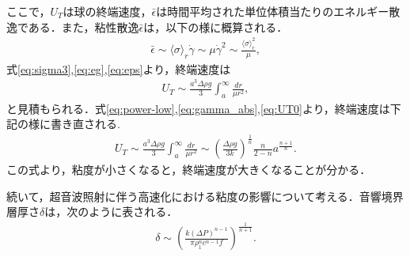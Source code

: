 ここで，$U_T$は球の終端速度，$\bar{\epsilon}$は時間平均された単位体積当たりのエネルギー散逸である．また，粘性散逸$\bar{\epsilon}$は，以下の様に概算される．
\begin{eqnarray}
    \bar{\epsilon} \sim \langle\sigma\rangle_r\dot{\gamma} \sim \mu \dot{\gamma}^2 \sim \frac{\langle\sigma\rangle_r^2}{\mu} ,
    \label{eq:eps}
\end{eqnarray}
式\ref{eq:sigma3},\ref{eq:eg},\ref{eq:eps}より，終端速度は
\begin{eqnarray}
    U_T \sim \frac{a^3\Delta\rho g}{3}\int_a^\infty\frac{dr}{\mu r^2} ,
    \label{eq:UT0}
\end{eqnarray}
と見積もられる．式\ref{eq:power-low},\ref{eq:gamma_abs},\ref{eq:UT0}より，終端速度は下記の様に書き直される.
\begin{eqnarray}
    U_T \sim \frac{a^3\Delta\rho g}{3}  \int^{\infty}_{a} \frac{dr}{\mu r^2} \sim \left(\frac{\Delta \rho g}{3k}\right)^{\frac{1}{n}}\frac{n}{2-n}a^{\frac{n+1}{n}} .
    \label{eq:UT}
\end{eqnarray}
この式より，粘度が小さくなると，終端速度が大きくなることが分かる．

続いて，超音波照射に伴う高速化における粘度の影響について考える．音響境界層厚さ$\delta$は，次のように表される．
\begin{eqnarray}
    \delta \sim \left(\frac{k\left(\Delta P\right)^{n-1}}{\pi \rho^n_1 c^{n-1} f}\right)^{\frac{1}{n+1}} .
    \label{eq:delta}
\end{eqnarray}


